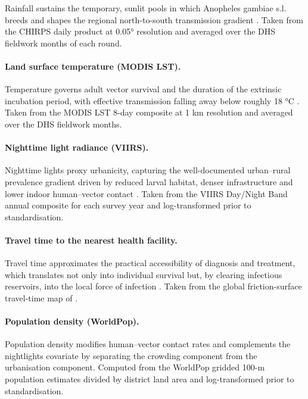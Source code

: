 \documentclass{article}
\begin{document}
Rainfall sustains the temporary, sunlit pools in which Anopheles gambiae
s.l. breeds and shapes the regional north-to-south transmission gradient
\citep{sinka2010dominant, bhatt2015}. Taken from the CHIRPS daily
product at 0.05° resolution \citep{funk2015chirps} and averaged over the
DHS fieldwork months of each round.

\paragraph{Land surface temperature (MODIS LST).}

Temperature governs adult vector survival and the duration of the
extrinsic incubation period, with effective transmission falling away
below roughly 18 °C \citep{gething2011modelling}. Taken from the MODIS
LST 8-day composite at 1 km resolution and averaged over the DHS
fieldwork months.

\paragraph{Nighttime light radiance (VIIRS).}

Nighttime lights proxy urbanicity, capturing the well-documented
urban--rural prevalence gradient driven by reduced larval habitat,
denser infrastructure and lower indoor human--vector contact
\citep{hay2005urbanization, tusting2019mapping}. Taken from the VIIRS
Day/Night Band annual composite \citep{elvidge2021} for each survey year
and log-transformed prior to standardisation.

\paragraph{Travel time to the nearest health facility.}

Travel time approximates the practical accessibility of diagnosis and
treatment, which translates not only into individual survival but, by
clearing infectious reservoirs, into the local force of infection
\citep{weiss2020}. Taken from the global friction-surface travel-time
map of \citep{weiss2020}.

\paragraph{Population density (WorldPop).}

Population density modifies human--vector contact rates and complements
the nightlights covariate by separating the crowding component from the
urbanisation component. Computed from the WorldPop gridded 100-m
population estimates \citep{tatem2017worldpop} divided by district land
area and log-transformed prior to standardisation.
\end{document}
